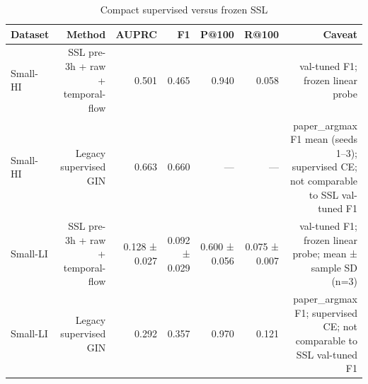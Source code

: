 \begin{table}[t]
\centering
\caption{Compact supervised versus frozen SSL}
\begin{tabular}{lrrrrrr}
\toprule
Dataset & Method & AUPRC & F1 & P@100 & R@100 & Caveat \\
\midrule
Small-HI & SSL pre-3h + raw + temporal-flow & 0.501 & 0.465 & 0.940 & 0.058 & val-tuned F1; frozen linear probe \\
Small-HI & Legacy supervised GIN & 0.663 & 0.660 & --- & --- & paper\_argmax F1 mean (seeds 1–3); supervised CE; not comparable to SSL val-tuned F1 \\
Small-LI & SSL pre-3h + raw + temporal-flow & 0.128 ± 0.027 & 0.092 ± 0.029 & 0.600 ± 0.056 & 0.075 ± 0.007 & val-tuned F1; frozen linear probe; mean ± sample SD (n=3) \\
Small-LI & Legacy supervised GIN & 0.292 & 0.357 & 0.970 & 0.121 & paper\_argmax F1; supervised CE; not comparable to SSL val-tuned F1 \\
\bottomrule
\end{tabular}
\end{table}
